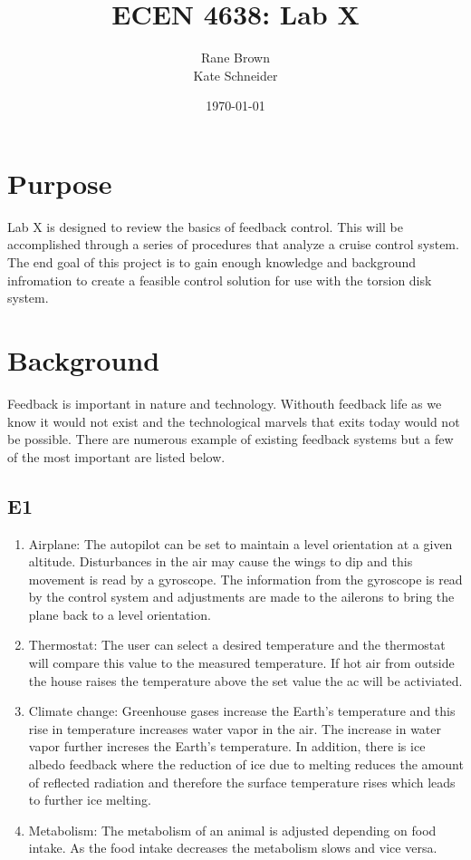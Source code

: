 \documentclass[11pt,titlepage]{article}
\author{Rane Brown \\ Kate Schneider}
\title{ECEN 4638: Lab X}
\date{\today}
\begin{document}
\maketitle

\section*{Purpose}
	Lab X is designed to review the basics of feedback control. This will be accomplished through a series of procedures that analyze a cruise control system. The end goal of this project is to gain enough knowledge and background infromation to create a feasible control solution for use with the torsion disk system.

\section*{Background}
	Feedback is important in nature and technology. Withouth feedback life as we know it would not exist and the technological marvels that exits today would not be possible. There are numerous example of existing feedback systems but a few of the most important are listed below.

	\subsection*{E1}
		\begin{enumerate}
			\item Airplane: The autopilot can be set to maintain a level orientation at a given altitude. Disturbances in the air may cause the wings to dip and this movement is read by a gyroscope. The information from the gyroscope is read by the control system and adjustments are made to the ailerons to bring the plane back to a level orientation.
			\item Thermostat: The user can select a desired temperature and the thermostat will compare this value to the measured temperature. If hot air from outside the house raises the temperature above the set value the ac will be activiated. 
			\item Climate change: Greenhouse gases increase the Earth's temperature and this rise in temperature increases water vapor in the air. The increase in water vapor further increses the Earth's temperature. In addition, there is ice albedo feedback where the reduction of ice due to melting reduces the amount of reflected radiation and therefore the surface temperature rises which leads to further ice melting.
			\item Metabolism: The metabolism of an animal is adjusted depending on food intake. As the food intake decreases the metabolism slows and vice versa.
		\end{enumerate}
\end{document}
